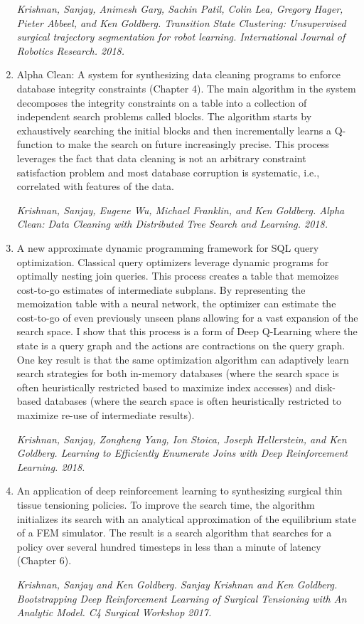 \begin{enumerate}
    \emph{Krishnan, Sanjay, Animesh Garg, Sachin Patil, Colin Lea, Gregory Hager, Pieter Abbeel, and Ken Goldberg. Transition State Clustering: Unsupervised surgical trajectory segmentation for robot learning. International Journal of Robotics Research. 2018.}

    \item Alpha Clean: A system for synthesizing data cleaning programs to enforce database integrity constraints (Chapter 4). The main algorithm in the system decomposes the integrity constraints on a table into a collection of independent search problems called blocks. The algorithm starts by exhaustively searching the initial blocks and then incrementally learns a Q-function to make the search on future increasingly precise. This process leverages the fact that data cleaning is not an arbitrary constraint satisfaction problem and most database corruption is systematic, i.e., correlated with features of the data. 

     \emph{Krishnan, Sanjay, Eugene Wu, Michael Franklin, and Ken Goldberg. Alpha Clean: Data Cleaning with Distributed Tree Search and Learning. 2018.}

    \item A new approximate dynamic programming framework for SQL query optimization. Classical query optimizers leverage dynamic programs for optimally nesting join queries. This process creates a table that memoizes cost-to-go estimates of intermediate subplans. By representing the memoization table with a neural network, the optimizer can estimate the cost-to-go of even previously unseen plans allowing for a vast expansion of the search space. I show that this process is a form of Deep Q-Learning where the state is a query graph and the actions are contractions on the query graph. One key result is that the same optimization algorithm can adaptively learn search strategies for both in-memory databases (where the search space is often heuristically restricted based to maximize index accesses) and disk-based databases (where the search space is often heuristically restricted to maximize re-use of intermediate results).

    \emph{Krishnan, Sanjay, Zongheng Yang, Ion Stoica, Joseph Hellerstein, and Ken Goldberg. Learning to Efficiently Enumerate Joins with Deep Reinforcement Learning. 2018.}
    
    \item An application of deep reinforcement learning to synthesizing surgical thin tissue tensioning policies. To improve the search time, the algorithm initializes its search with an analytical approximation of the equilibrium state of a FEM simulator. The result is a search algorithm that searches for a policy over several hundred timesteps in less than a minute of latency (Chapter 6). 

     \emph{Krishnan, Sanjay and Ken Goldberg. Sanjay Krishnan and Ken Goldberg. Bootstrapping Deep Reinforcement Learning of Surgical Tensioning with An Analytic Model. C4 Surgical Workshop 2017.}
    
\end{enumerate}

